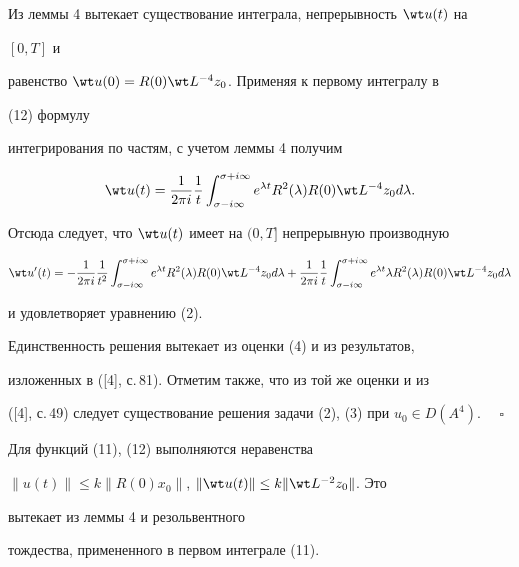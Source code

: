 Из леммы 4 вытекает существование интеграла, непрерывность $\wt u(t)$ на 


$[0,T]$ и 


равенство $\wt u(0)=R(0)\wt L{}^{-4}z_0$. Применяя к первому интегралу в 


(12) формулу 


интегрирования по частям, с учетом леммы 4 получим 


$$ 


\wt u(t)= 


\frac{1}{2\pi i}\frac{1}{t} 


\int^{\sigma+i\infty}_{\sigma-i\infty}e^{\lambda t} 


R^2(\lambda)R(0)\wt L{}^{-4}z_0d\lambda. 


$$ 


Отсюда следует, что $\wt u(t)$ имеет на $(0,T]$ непрерывную производную 


$$ 


\wt u'(t)= 


-\frac{1}{2\pi i}\frac{1}{t^2} 


\int^{\sigma+i\infty}_{\sigma-i\infty}e^{\lambda t} 


R^2(\lambda)R(0)\wt L{}^{-4}z_0d\lambda+ 


\frac{1}{2\pi i}\frac{1}{t} 


\int^{\sigma+i\infty}_{\sigma-i\infty}e^{\lambda t} 


\lambda R^2(\lambda)R(0)\wt L{}^{-4}z_0d\lambda 


$$ 


и удовлетворяет уравнению (2). 


 


Единственность решения вытекает из оценки (4) и из результатов, 


изложенных в ([4], с.\,81). Отметим также, что из той же оценки и из 


([4], с.\,49) следует существование решения задачи (2), (3) при $u_0\in 


D(A^4)$. $\quad\square$


 


 


\begin{notenonum} 


Для функций (11), (12) выполняются неравенства 


$\|u(t)\|\le k\|R(0)x_0\|$, $\|\wt u(t)\|\le k\|\wt L{}^{-2}z_0\|$. Это 


вытекает из леммы 4 и резольвентного 


тождества, примененного в первом интеграле (11). 


\end{notenonum} 


